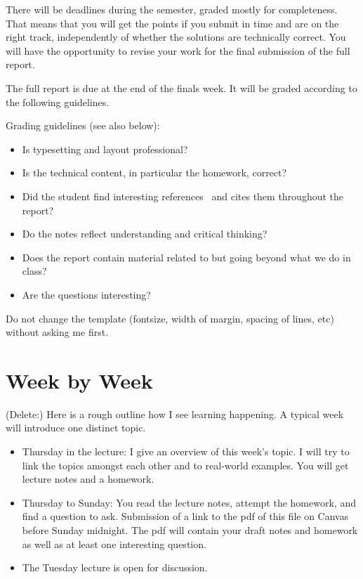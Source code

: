 \documentclass{article}
\theoremstyle{theorem}
\theoremstyle{definition}
\theoremstyle{remark}
\begin{document}
There will be deadlines during the semester, graded mostly for completeness. That means that you will get the points if you submit in time and are on the right track, independently of whether the solutions are technically correct. You will have the opportunity to revise your work for the final submission of the full report.

The full report is due at the end of the finals week. It will be graded according to the following guidelines.

Grading  guidelines (see also below):
\begin{itemize}
\item Is typesetting and layout professional? 
\item Is the technical content, in particular the homework, correct?
\item Did the student find interesting references~\cite{bla} and cites them throughout the report?
\item Do the notes reflect understanding and critical thinking?
\item Does the report contain material related to but going beyond what we do in class?
\item Are the questions interesting?
\end{itemize}

Do not change the template (fontsize, width of margin, spacing of lines, etc) without asking me first.

\section{Week by Week}\label{homework}

(Delete:) Here is a rough outline how I see learning happening. A typical week will introduce one distinct topic.
\begin{itemize}
  \item Thursday in the lecture: I give an overview of this week's topic. I will try to link the topics amongst each other and to real-world examples. You will get lecture notes and a homework.
  \item Thursday to Sunday: You read the lecture notes, attempt the homework, and find a question to ask. Submission of a link to the pdf of this file on Canvas before Sunday midnight. The pdf will contain your draft notes and homework as well as at least one interesting question.
  \item The Tuesday lecture is open for discussion. 
\end{itemize}
\end{document}
